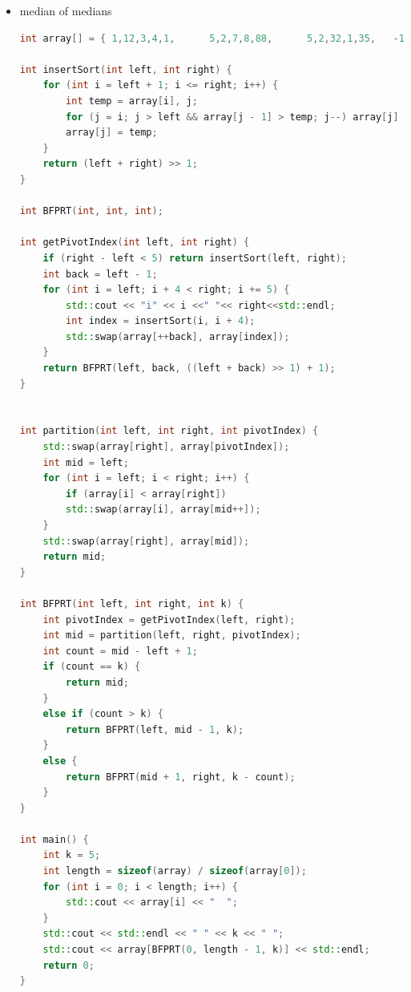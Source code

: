 \documentclass[a4paper,11pt,twoside]{book}
\begin{document}
\begin{itemize}
\begin{lstlisting}
template <typename Iterator, typename Predicate>
Iterator my_stable_partition(Iterator first, Iterator last,
Predicate predicate) {
	auto n = std::distance(first, last);
	if (n <= 1) {
		if (n == 1 && predicate(*first))
		++first;
		return first;
	}
	auto middle = first;
	std::advance(middle, n / 2);
	auto a = my_stable_partition(first, middle, predicate);
	auto b = my_stable_partition(middle, last, predicate);
	return std::rotate(a, middle, b);
}	
\end{lstlisting}
	
	\item median of medians
\begin{lstlisting}[frame=single, language=c++, basicstyle=\scriptsize]
int array[] = { 1,12,3,4,1,      5,2,7,8,88,      5,2,32,1,35,   -1,7,5,38,-11 };

int insertSort(int left, int right) {
	for (int i = left + 1; i <= right; i++) {
		int temp = array[i], j;
		for (j = i; j > left && array[j - 1] > temp; j--) array[j] = array[j - 1];
		array[j] = temp;
	}
	return (left + right) >> 1;
}

int BFPRT(int, int, int);

int getPivotIndex(int left, int right) {
	if (right - left < 5) return insertSort(left, right);
	int back = left - 1;
	for (int i = left; i + 4 < right; i += 5) {
		std::cout << "i" << i <<" "<< right<<std::endl;
		int index = insertSort(i, i + 4);
		std::swap(array[++back], array[index]);
	}
	return BFPRT(left, back, ((left + back) >> 1) + 1);
}


int partition(int left, int right, int pivotIndex) {
	std::swap(array[right], array[pivotIndex]);
	int mid = left;
	for (int i = left; i < right; i++) {
		if (array[i] < array[right])
		std::swap(array[i], array[mid++]);
	}
	std::swap(array[right], array[mid]);
	return mid;
}

int BFPRT(int left, int right, int k) {
	int pivotIndex = getPivotIndex(left, right);
	int mid = partition(left, right, pivotIndex);
	int count = mid - left + 1;
	if (count == k) {
		return mid;
	}
	else if (count > k) {
		return BFPRT(left, mid - 1, k);
	}
	else {
		return BFPRT(mid + 1, right, k - count);
	}
}

int main() {
	int k = 5;
	int length = sizeof(array) / sizeof(array[0]);
	for (int i = 0; i < length; i++) {
		std::cout << array[i] << "  ";
	}
	std::cout << std::endl << " " << k << " ";
	std::cout << array[BFPRT(0, length - 1, k)] << std::endl;
	return 0;
}
	
\end{lstlisting}

\end{itemize}
\end{document}
